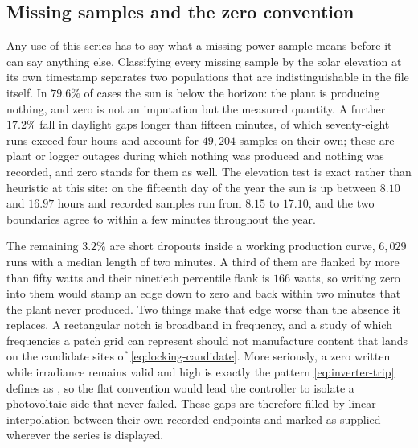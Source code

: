\subsection{Missing samples and the zero convention}

Any use of this series has to say what a missing power sample means before it can say anything else. Classifying every missing sample by the solar elevation at its own timestamp separates two populations that are indistinguishable in the file itself. In $79.6\%$ of cases the sun is below the horizon: the plant is producing nothing, and zero is not an imputation but the measured quantity. A further $17.2\%$ fall in daylight gaps longer than fifteen minutes, of which seventy-eight runs exceed four hours and account for $49{,}204$ samples on their own; these are plant or logger outages during which nothing was produced and nothing was recorded, and zero stands for them as well. The elevation test is exact rather than heuristic at this site: on the fifteenth day of the year the sun is up between $8.10$ and $16.97$ hours and recorded samples run from $8.15$ to $17.10$, and the two boundaries agree to within a few minutes throughout the year.

The remaining $3.2\%$ are short dropouts inside a working production curve, $6{,}029$ runs with a median length of two minutes. A third of them are flanked by more than fifty watts and their ninetieth percentile flank is $166$ watts, so writing zero into them would stamp an edge down to zero and back within two minutes that the plant never produced. Two things make that edge worse than the absence it replaces. A rectangular notch is broadband in frequency, and a study of which frequencies a patch grid can represent should not manufacture content that lands on the candidate sites of \autoref{eq:locking-candidate}. More seriously, a zero written while irradiance remains valid and high is exactly the pattern \autoref{eq:inverter-trip} defines as , so the flat convention would lead the controller to isolate a photovoltaic side that never failed. These gaps are therefore filled by linear interpolation between their own recorded endpoints and marked as supplied wherever the series is displayed.

